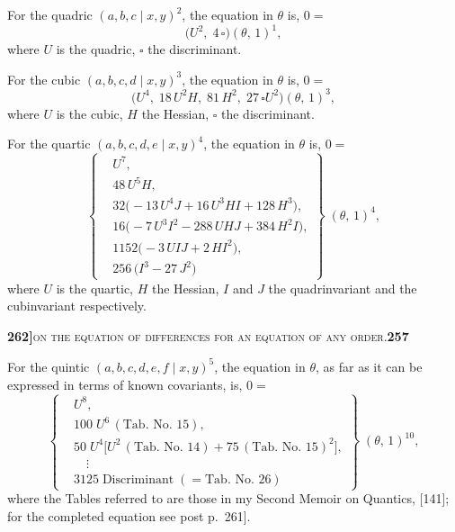 \documentclass[11pt]{article}
\newcommand{\Cdel}{\mid}
\begin{document}
\medskip

\noindent For the quadric $(a, b, c \Cdel x, y)^2$, the equation in $\theta$ is, $0 =$
\[
  \bigl(U^2,\; 4\,\square\bigr)(\theta,\,1)^1,
\]
where $U$ is the quadric, $\square$ the discriminant.

\medskip

\noindent For the cubic $(a, b, c, d \Cdel x, y)^3$, the equation in $\theta$ is, $0 =$
\[
  \bigl(U^4,\; 18\,U^2 H,\; 81\,H^2,\; 27\,\square U^2\bigr)(\theta,\,1)^3,
\]
where $U$ is the cubic, $H$ the Hessian, $\square$ the discriminant.

\medskip

\noindent For the quartic $(a, b, c, d, e \Cdel x, y)^4$, the equation in $\theta$ is, $0 =$
\[
\left\{
\begin{aligned}
   & U^7,\\
   & 48\,U^5 H,\\
   & 32\bigl(-13\,U^4 J + 16\,U^3 H I + 128\,H^3\bigr),\\
   & 16\bigl(-7\,U^3 I^2 - 288\,U H J + 384\,H^2 I\bigr),\\
   & 1152\bigl(-3\,U I J + 2\,H I^2\bigr),\\
   & 256\,\bigl(I^3 - 27\,J^2\bigr)
\end{aligned}
\right\}\;(\theta,\,1)^4,
\]
where $U$ is the quartic, $H$ the Hessian, $I$ and $J$ the quadrinvariant and the cubinvariant respectively.

\newpage
\setcounter{page}{257}

\noindent\textbf{262]}\hfill\textsc{on the equation of differences for an equation of any order.}\hfill\textbf{257}

\medskip

\noindent For the quintic $(a, b, c, d, e, f \Cdel x, y)^5$, the equation in $\theta$, as far as it can be expressed in terms of known covariants, is, $0 =$
\[
\left\{
\begin{aligned}
   & U^8,\\
   & 100\;U^6\,(\text{Tab. No. 15}),\\
   & 50\;U^4\bigl[U^2\,(\text{Tab. No. 14}) + 75\,(\text{Tab. No. 15})^2\bigr],\\
   & \quad\vdots\\[2pt]
   & 3125\;\text{Discriminant}\;(=\text{Tab. No. 26})
\end{aligned}
\right\}\;(\theta,\,1)^{10},
\]
where the Tables referred to are those in my Second Memoir on Quantics, [141]; for the completed equation see post p.~261].
\end{document}
